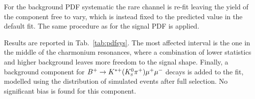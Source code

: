 \begin{center}
\begin{table}[h]
\centering
\caption{$\chi^2$, NDF, p-values and number of signal events obtained fitting \mbox{$\Lb\to\jpsi\Lz$} data using different models.}
\label{PDFsys}
\end{table}
\end{center}

For the background PDF systematic the rare channel is re-fit leaving the yield of the \KS component free to vary, which
is instead fixed to the predicted value in the default fit. The same procedure as for the signal PDF is applied.

Results are reported in Tab.~\ref{tab:pdfsys}. The most affected \qsq interval is the one in the middle of the charmonium
resonances, where a combination of lower statistics and higher background leaves more freedom to the signal shape.
Finally, a background component for $B^{+} \ra K^{*+}(\KS\pi^+)\mumu$ decays is added to the fit, modelled using
the distribution of simulated events after full selection. No significant bias is found for this component.

